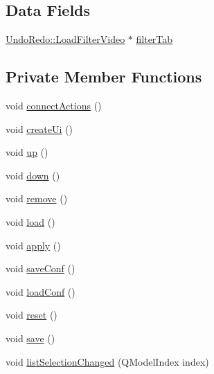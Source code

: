 \subsection*{Data Fields}
\begin{DoxyCompactItemize}
\item 
\hyperlink{classUndoRedo_1_1LoadFilterVideo}{Undo\+Redo\+::\+Load\+Filter\+Video} $\ast$ \hyperlink{classGUI_1_1FilterTab_a2cf35b3ca5c4cf4888621bb7b2e103a7}{filter\+Tab}
\end{DoxyCompactItemize}
\subsection*{Private Member Functions}
\begin{DoxyCompactItemize}
\item 
void \hyperlink{classGUI_1_1FilterTab_ac3ca31ff0047daecf8bbe393a15e940c}{connect\+Actions} ()
\item 
void \hyperlink{classGUI_1_1FilterTab_aa72182c9a958af0e87b65ab7bdba0035}{create\+Ui} ()
\item 
void \hyperlink{classGUI_1_1FilterTab_a0a1d932d49dd1079cfd0964b11adc7a0}{up} ()
\item 
void \hyperlink{classGUI_1_1FilterTab_a6663cf1e20c2f8162d29d31c8f6324e6}{down} ()
\item 
void \hyperlink{classGUI_1_1FilterTab_a1fcb45e5d2428352eb36b487d1d4eea3}{remove} ()
\item 
void \hyperlink{classGUI_1_1FilterTab_a78f61ac2dd03bcba8e09ca20cd7d68e3}{load} ()
\item 
void \hyperlink{classGUI_1_1FilterTab_a95067243b72a23863ec07c821797455c}{apply} ()
\item 
void \hyperlink{classGUI_1_1FilterTab_aca3e1f51d9d95bb5f353275bda471260}{save\+Conf} ()
\item 
void \hyperlink{classGUI_1_1FilterTab_a6a47b95b078bb5310cd420104f09966f}{load\+Conf} ()
\item 
void \hyperlink{classGUI_1_1FilterTab_ad20897c5c8bd47f5d4005989bead0e55}{reset} ()
\item 
void \hyperlink{classGUI_1_1FilterTab_aae2c382151ef7c9aa913361172b30db6}{save} ()
\item 
void \hyperlink{classGUI_1_1FilterTab_a925c74d61941e57111324aa0d1f4bb85}{list\+Selection\+Changed} (Q\+Model\+Index index)
\end{DoxyCompactItemize}
